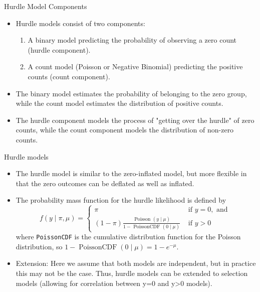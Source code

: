 \documentclass[10pt,ignorenonframetext,aspectratio=169]{beamer}
\begin{document}
\begin{frame}{Hurdle Model Components}
\begin{itemize}
\item Hurdle models consist of two components:
\begin{enumerate}
\item A binary model predicting the probability of observing a zero count (hurdle component).
\item A count model (Poisson or Negative Binomial) predicting the positive counts (count component).
\end{enumerate}
\item The binary model estimates the probability of belonging to the zero group, while the count model estimates the distribution of positive counts.
\item The hurdle component models the process of "getting over the hurdle" of zero counts, while the count component models the distribution of non-zero counts.
\end{itemize}
\end{frame}


\begin{frame}{Hurdle models}
  \begin{itemize}
      \item The hurdle model is similar to the zero-inflated model, but more flexible in that the zero outcomes can be deflated as well as inflated. 
      \item The probability mass function for the hurdle likelihood is defined by
      $$
f(y \mid \pi, \mu)=\left\{\begin{array}{ll}\pi & \text { if } y=0, \text { and } \\ (1-\pi) \frac{\text { Poisson }(y \mid \mu)}{1-\text { PoissonCDF }(0 \mid \mu)} & \text { if } y>0\end{array}\right.
$$
where \texttt{PoissonCDF} is the cumulative distribution function for the Poisson distribution, so $1-\operatorname{PoissonCDF}(0\mid\mu) = 1-e^{-\mu}$.
\item Extension: Here we assume that both models are independent, but in practice this may not be the case. Thus, hurdle models can be extended to selection models (allowing for correlation between y=0 and y>0 models).
  \end{itemize}  
\end{frame}
\end{document}
